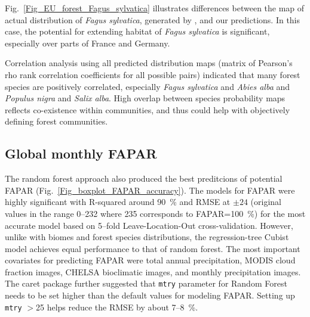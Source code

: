 \documentclass[fleqn,10pt,lineno]{wlpeerj} %
\begin{document}
Fig.\@~\ref{Fig_EU_forest_Fagus_sylvatica} illustrates differences between the map of actual distribution of \emph{Fagus sylvatica}, generated by \citet{brus2012statistical}, and our predictions. In this case, the potential for extending habitat of \emph{Fagus sylvatica} is significant, especially over parts of France and Germany.\par

Correlation analysis using all predicted distribution maps (matrix of Pearson's rho rank correlation coefficients for all possible pairs) indicated that many forest species are positively correlated, especially \emph{Fagus sylvatica} and \emph{Abies alba} and \emph{Populus nigra} and \emph{Salix alba}. High overlap between species probability maps reflects co-existence within communities, and thus could help with objectively defining forest communities.\par 

\newpage
\subsection*{Global monthly FAPAR}

The random forest approach also produced the best preditcions of potential FAPAR  (Fig.\@~\ref{Fig_boxplot_FAPAR_accuracy}). The models for FAPAR were highly significant with R-squared around \SI{90}{\percent} and RMSE at $\pm 24$ (original values in the range 0--232 where 235 corresponds to FAPAR=\SI{100}{\percent}) for the most accurate model based on 5--fold Leave-Location-Out cross-validation. However, unlike with biomes and forest species distributions, the regression-tree Cubist model achieves equal performance to that of random forest. The most important covariates for predicting FAPAR were total annual precipitation, MODIS cloud fraction images, CHELSA bioclimatic images, and monthly precipitation images. The \textsf{caret} package further suggested that \verb"mtry" parameter for Random Forest needs to be set higher than the default values for modeling FAPAR. Setting up \verb"mtry" $>$25 helps reduce the RMSE by about 7--\SI{8}{\percent}. \par
\end{document}
